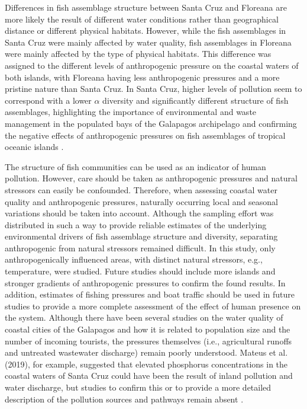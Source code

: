 \documentclass[jmse,article,accept,moreauthors,pdftex]{Definitions/mdpi}
\begin{document}
\begin{paracol}{2}
Differences in fish assemblage structure between Santa Cruz and Floreana are more likely the result of different water conditions rather than geographical distance or different physical habitats. However, while the fish assemblages in Santa Cruz were mainly affected by water quality, fish assemblages in Floreana were mainly affected by the type of physical habitats. This difference was assigned to the different levels of anthropogenic pressure on the coastal waters of both islands, with Floreana having less anthropogenic pressures and a more pristine nature than Santa Cruz. In Santa Cruz, higher levels of pollution seem to correspond with a lower $\alpha$ diversity and significantly different structure of fish assemblages, highlighting the importance of environmental and waste management in the populated bays of the Galapagos archipelago and confirming the negative effects of anthropogenic pressures on fish assemblages of tropical oceanic islands \citep{Quimbayo2019DeterminantsIslands,Sandin2008IslandFish}. 

The structure of fish communities can be used as an indicator of human pollution. However, care should be taken as anthropogenic pressures and natural stressors can easily be confounded. Therefore, when assessing coastal water quality and anthropogenic pressures, naturally occurring local and seasonal variations should be taken into account. Although the sampling effort was distributed in such a way to provide reliable estimates of the underlying environmental drivers of fish assemblage structure and diversity, separating anthropogenic from natural stressors remained difficult. In this study, only anthropogenically influenced areas, with distinct natural stressors, e.g., temperature, were studied. Future studies should include more islands and stronger gradients of anthropogenic pressures to confirm the found results. In addition, estimates of fishing pressures and boat traffic should be used in future studies to provide a more complete assessment of the effect of human presence on the system. Although there have been several studies on the water quality of coastal cities of the Galapagos and how it is related to population size and the number of incoming tourists, the pressures themselves (i.e., agricultural runoffs and untreated wastewater discharge) remain poorly understood. Mateus et al. (2019), for example, suggested that elevated phosphorus concentrations in the coastal waters of Santa Cruz could have been the result of inland pollution and water discharge, but studies to confirm this or to provide a more detailed description of the pollution sources and pathways remain absent \citep{Mateus2019AnArchipelago}.


\end{paracol}
\end{document}
